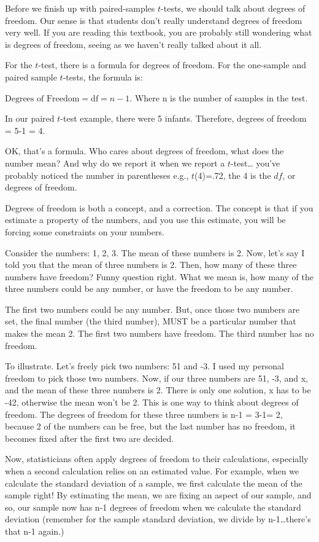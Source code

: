\documentclass[]{book}
\begin{document}
Before we finish up with paired-samples \(t\)-tests, we should talk about degrees of freedom. Our sense is that students don't really understand degrees of freedom very well. If you are reading this textbook, you are probably still wondering what is degrees of freedom, seeing as we haven't really talked about it all.

For the \(t\)-test, there is a formula for degrees of freedom. For the one-sample and paired sample \(t\)-tests, the formula is:

\(\text{Degrees of Freedom} = \text{df} = n-1\). Where n is the number of samples in the test.

In our paired \(t\)-test example, there were 5 infants. Therefore, degrees of freedom = 5-1 = 4.

OK, that's a formula. Who cares about degrees of freedom, what does the number mean? And why do we report it when we report a \(t\)-test\ldots{} you've probably noticed the number in parentheses e.g., \(t\)(4)=.72, the 4 is the \(df\), or degrees of freedom.

Degrees of freedom is both a concept, and a correction. The concept is that if you estimate a property of the numbers, and you use this estimate, you will be forcing some constraints on your numbers.

Consider the numbers: 1, 2, 3. The mean of these numbers is 2. Now, let's say I told you that the mean of three numbers is 2. Then, how many of these three numbers have freedom? Funny question right. What we mean is, how many of the three numbers could be any number, or have the freedom to be any number.

The first two numbers could be any number. But, once those two numbers are set, the final number (the third number), MUST be a particular number that makes the mean 2. The first two numbers have freedom. The third number has no freedom.

To illustrate. Let's freely pick two numbers: 51 and -3. I used my personal freedom to pick those two numbers. Now, if our three numbers are 51, -3, and x, and the mean of these three numbers is 2. There is only one solution, x has to be -42, otherwise the mean won't be 2. This is one way to think about degrees of freedom. The degrees of freedom for these three numbers is n-1 = 3-1= 2, because 2 of the numbers can be free, but the last number has no freedom, it becomes fixed after the first two are decided.

Now, statisticians often apply degrees of freedom to their calculations, especially when a second calculation relies on an estimated value. For example, when we calculate the standard deviation of a sample, we first calculate the mean of the sample right! By estimating the mean, we are fixing an aspect of our sample, and so, our sample now has n-1 degrees of freedom when we calculate the standard deviation (remember for the sample standard deviation, we divide by n-1\ldots{}there's that n-1 again.)
\end{document}
